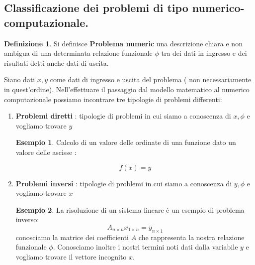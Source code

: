 \documentclass[12pt, a4paper]{book}
\theoremstyle{definition}
\newtheorem{exmp}{Esempio}[section]
\newtheorem{defn}{Definizione}[section]
\begin{document}
\subsection{Classificazione dei problemi di tipo numerico-computazionale.}
\begin{flushleft}

\begin{defn}
	Si definisce \textbf{Problema numeric} una descrizione chiara e non ambigua di una determinata relazione funzionale $\phi$ tra dei dati in ingresso e dei risultati detti anche dati di uscita. 
\end{defn}
\vspace{1cm}

Siano dati $x,y$ come dati di ingresso e uscita del problema ( non necessariamente in quest'ordine).
Nell'effettuare il passaggio dal modello matematico al numerico computazionale possiamo incontrare tre tipologie di problemi differenti: 

\begin{enumerate}
	\item \textbf{Problemi diretti} : tipologie di problemi in cui siamo a conoscenza di $x, \phi$ e vogliamo trovare $y$
\begin{exmp}

Calcolo di un valore delle ordinate di una funzione dato un valore delle ascisse :

\[
	f(x) = y
\]
\end{exmp}
\item \textbf{Problemi inversi} : tipologie di problemi in cui siamo a conoscenza di $y, \phi$ e vogliamo trovare $x$
\begin{exmp}
La risoluzione di un sistema lineare è un esempio di problema inverso: 
\[ 
	A_{n \times n} x_{1 \times n} = y_{n \times 1}
\]
conosciamo la matrice dei coefficienti $A$ che rappresenta la nostra relazione funzionale $\phi$.  Conosciamo inoltre i nostri termini noti dati dalla variabile $y$ e vogliamo trovare il vettore incognito $x$.
\end{exmp}


\end{enumerate}
\end{flushleft}
\end{document}
